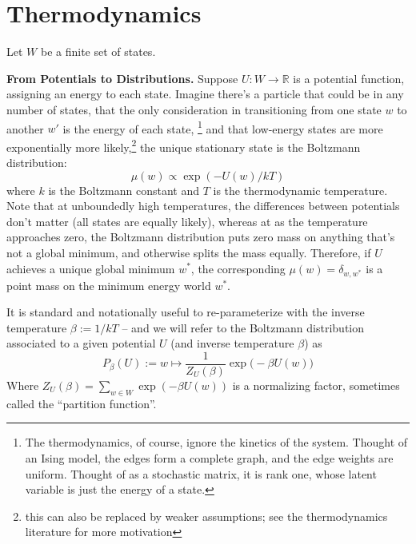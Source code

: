 \documentclass{article}
\begin{document}
	\section{Thermodynamics}\label{sec:thermo}
	Let $W$ be a finite set of states.
	
	\textbf{From Potentials to Distributions.}
	Suppose $U: W \to \mathbb R$ is a potential function, assigning an energy to each state. Imagine there's a particle that could be in any number of states, that the only consideration in transitioning from one state $w$ to another $w'$ is the energy of each state,%
		\footnote{The thermodynamics, of course, ignore the kinetics of the system. Thought of an Ising model, the edges form a complete graph, and the edge weights are uniform. Thought of as a stochastic matrix, it is rank one, whose latent variable is just the energy of a state.}
	and that low-energy states are more exponentially more likely,\footnote{this can also be replaced by weaker assumptions; see the thermodynamics literature for more motivation}
	the unique stationary state is the Boltzmann distribution:
	\[ \mu(w) \propto \exp( - U(w) / kT ) \]
	where $k$ is the Boltzmann constant and $T$ is the thermodynamic temperature. Note that at unboundedly high temperatures, the differences between potentials don't matter (all states are equally likely), whereas at as the temperature approaches zero, the Boltzmann distribution puts zero mass on anything that's not a global minimum, and otherwise splits the mass equally. Therefore, if $U$ achieves a unique global minimum $w^*$, the corresponding $\mu(w) = \delta_{w,w^*}$ is a point mass on the minimum energy world $w^*$.
	
	It is standard and notationally useful to re-parameterize with the inverse temperature $\beta := 1/kT$ -- and we will refer to the Boltzmann distribution associated to a given potential $U$ (and inverse temperature $\beta$) as 
	\[ P_{\beta}(U) := w \mapsto  \frac{1}{Z_U(\beta)}\exp\Big(-\beta U(w)\Big) \]
	Where $Z_U(\beta) = \sum_{w \in W} \exp(-\beta U(w))$ is a normalizing factor, sometimes called the ``partition function''.	
	
\end{document}
